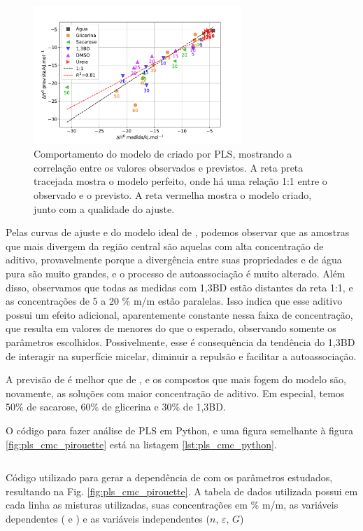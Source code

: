 		\begin{figure}[H]
			\centering
			\includegraphics[width=0.7\textwidth]{imagens/itc/PLS_dh_pirouette}
			\caption{Comportamento do modelo de \DHmic{} criado por PLS, mostrando a correlação entre os valores observados e previstos. A reta preta tracejada mostra o modelo perfeito, onde há uma relação 1:1 entre o observado e o previsto. A reta vermelha mostra o modelo criado, junto com a qualidade do ajuste.}
			\label{fig:pls_dh_pirouette}
		\end{figure} 
		
		Pelas curvas de ajuste e do modelo ideal de \cmc, podemos observar que as amostras que mais divergem da região central são aquelas com alta concentração de aditivo, provavelmente porque a divergência entre suas propriedades e de água pura são muito grandes, e o processo de autoassociação é muito alterado. Além disso, observamos que todas as medidas com 1,3BD estão distantes da reta 1:1, e as concentrações de 5 a 20 \% m/m estão paralelas. Isso indica que esse aditivo possui um efeito adicional, aparentemente constante nessa faixa de concentração, que resulta em valores de \cmc{} menores do que o esperado, observando somente os parâmetros escolhidos. Possivelmente, esse é consequência da tendência do 1,3BD de interagir na superfície micelar, diminuir a repulsão e facilitar a autoassociação.
		
		A previsão de \DHmic{} é melhor que de \cmc, e os compostos que mais fogem do modelo são, novamente, as soluções com maior concentração de aditivo. Em especial, temos 50\% de sacarose, 60\% de glicerina e 30\% de 1,3BD.
		
		O código para fazer análise de PLS em Python, e uma figura semelhante à figura \ref{fig:pls_cmc_pirouette} está na listagem \ref{lst:pls_cmc_python}.
		
		\begin{listing}[h]
			\inputminted{python}{./python/pls_cmc_sklearn.py}
			\caption{Código utilizado para gerar a dependência de \cmc{} com os parâmetros estudados, resultando na Fig. \ref{fig:pls_cmc_pirouette}. A tabela de dados utilizada possui em cada linha as misturas utilizadas, suas concentrações em \% m/m, as variáveis dependentes (\cmc{} e \DHmic) e as variáveis independentes (\(n\), \(\varepsilon\), \(G\))}
			\label{lst:pls_cmc_python}
		\end{listing}
		
